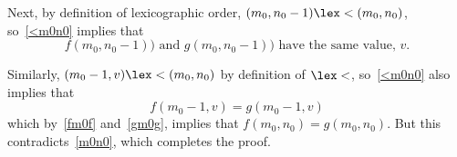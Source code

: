 Next, by definition of lexicographic order, $(m_0,n_0-1) \lex< (m_0,n_0)$,
so~\eqref{<m0n0} implies that
\[f(m_0,n_0-1)) \text{ and } g(m_0,n_0-1))\text{ have the same value, } v.
\]

Similarly, $(m_0-1,v)\lex< (m_0,n_0)$ by definition of $\lex<$,
so~\eqref{<m0n0} also implies that
\begin{equation}
f(m_0-1,v) = g(m_0-1,v)
\end{equation}
which by~\eqref{fm0f} and~\eqref{gm0g}, implies that $f(m_0,n_0) =
g(m_0,n_0)$.  But this contradicts~\eqref{m0n0}, which completes the
proof.


\endinput
